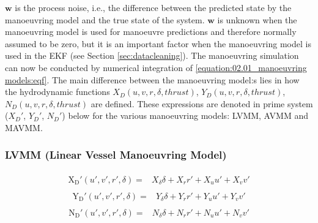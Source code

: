 \(\mathbf{w}\) is the process noise, i.e., the difference between the predicted state by the manoeuvring model and the true
state of the system. \(\mathbf{w}\) is unknown when the manoeuvring model is used for manoeuvre predictions and therefore normally
assumed to be zero, but it is an important factor when the manoeuvring model is used in the EKF (see Section \ref{sec:datacleaning}).
The manoeuvring simulation can now be conducted by numerical integration of \autoref{equation:02.01_manoeuvring models:eqf}. The main difference between the manoeuvring model:s lies in how the hydrodynamic functions \(X_D(u,v,r,\delta,thrust)\), \(Y_D(u,v,r,\delta,thrust)\), \(N_D(u,v,r,\delta,thrust)\) are defined. These expressions are denoted in prime system ($X_D'$, $Y_D'$, $N_D'$) below for the various manoeuvring models: LVMM, AVMM and MAVMM.

\subsubsection*{LVMM (Linear Vessel Manoeuvring Model) \cite{matusiak_dynamics_2017}}
\begin{equation}\label{equation:02.01_manoeuvring models:eqxlinear}
\begin{split}\begin{split}
\operatorname{X_{D}'}{\left(u',v',r',\delta\right)} = & X_{\delta} \delta + X_{r} r' + X_{u} u' + X_{v} v' 
\end{split}\end{split}
\end{equation}\begin{equation}\label{equation:02.01_manoeuvring models:eqylinear}
\begin{split}\begin{split}
\operatorname{Y_{D}'}{\left(u',v',r',\delta \right)} = & Y_{\delta} \delta + Y_{r} r' + Y_{u} u' + Y_{v} v' 
\end{split}\end{split}
\end{equation}\begin{equation}\label{equation:02.01_manoeuvring models:eqnlinear}
\begin{split}\begin{split}
\operatorname{N_{D}'}{\left(u',v',r',\delta \right)} = & N_{\delta} \delta + N_{r} r' + N_{u} u' + N_{v} v' 
\end{split}\end{split}
\end{equation}
\sphinxAtStartPar
